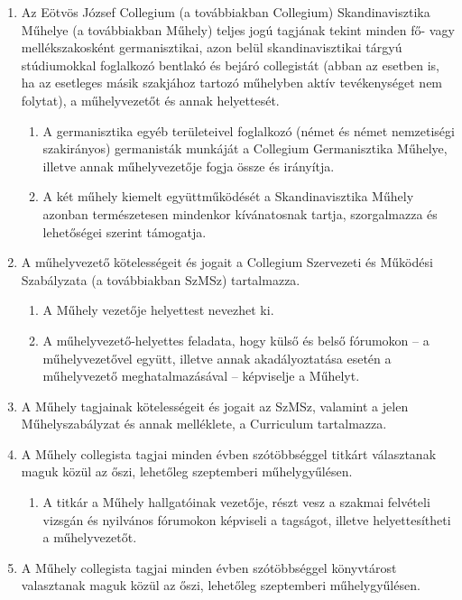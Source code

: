 \documentclass{../styles/rulebook}
\begin{document}
\begin{enumerate}
	\item Az Eötvös József Collegium (a továbbiakban Collegium) Skandinavisztika Műhelye (a továbbiakban Műhely) teljes jogú tagjának tekint minden fő- vagy mellékszakosként germanisztikai, azon belül skandinavisztikai tárgyú stúdiumokkal foglalkozó bentlakó és bejáró
	collegistát (abban az esetben is, ha az esetleges másik szakjához tartozó
	műhelyben aktív tevékenységet nem folytat), a műhelyvezetőt és annak
	helyettesét. 
	\begin{enumerate}
		\item A germanisztika egyéb területeivel foglalkozó (német és német
		nemzetiségi szakirányos) germanisták munkáját a Collegium Germanisztika
		Műhelye, illetve annak műhelyvezetője fogja össze és irányítja.
		\item A két műhely kiemelt együttműködését a Skandinavisztika Műhely azonban természetesen mindenkor kívánatosnak tartja, szorgalmazza és lehetőségei szerint támogatja.
	\end{enumerate}
	\item A műhelyvezető kötelességeit és jogait a Collegium Szervezeti és Működési
	Szabályzata (a továbbiakban SzMSz) tartalmazza. 
	\begin{enumerate}
		\item A Műhely vezetője helyettest nevezhet ki.
		\item A	műhelyvezető-helyettes feladata, hogy külső és belső fórumokon -- a
		műhelyvezetővel együtt, illetve annak akadályoztatása esetén a műhelyvezető
		meghatalmazásával -- képviselje a Műhelyt.
	\end{enumerate}
	\item A Műhely tagjainak kötelességeit és jogait az SzMSz, valamint a jelen Műhelyszabályzat és annak melléklete, a Curriculum tartalmazza.
	\item A Műhely collegista tagjai minden évben szótöbbséggel titkárt választanak
	maguk közül az őszi, lehetőleg szeptemberi műhelygyűlésen. 
	\begin{enumerate}
		\item A titkár a Műhely	hallgatóinak vezetője, részt vesz a szakmai felvételi vizsgán és nyilvános fórumokon képviseli a tagságot, illetve helyettesítheti a műhelyvezetőt.
	\end{enumerate}
	\item A Műhely collegista tagjai minden évben szótöbbséggel
	könyvtárost valasztanak maguk közül az őszi, lehetőleg szeptemberi műhelygyűlésen.
	\begin{enumerate}

\end{enumerate}
\end{enumerate}
\end{document}
